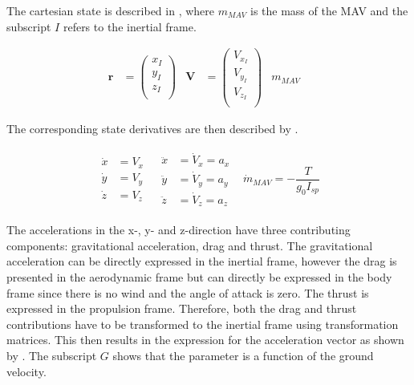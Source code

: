 The cartesian state is described in , where $m_{MAV}$ is the mass of the \ac{MAV} and the subscript $I$ refers to the inertial frame.

\begin{align} \label{eq:state}
\mathbf{r}&=\begin{pmatrix}
x_{I}\\
y_{I}\\
z_{I}\\
\end{pmatrix}
&
\mathbf{V}&=\begin{pmatrix}
V_{x_{I}} \\
V_{y_{I}} \\
V_{z_{I}}\\
\end{pmatrix}
&
m_{MAV}&
\end{align}


\noindent
The corresponding state derivatives are then described by .

\begin{align} \label{eq:state_derivatives}
\begin{split} 
\dot{x}&=V_{x}\\
\dot{y}&=V_{y}\\
\dot{z}&=V_{z}
\end{split} 
&
\begin{split}
\ddot{x}&=\dot{V}_{x}=a_{x}\\
\ddot{y}&=\dot{V}_{y}=a_{y}\\
\ddot{z}&=\dot{V}_{z}=a_{z}
\end{split}
&
\dot{m}_{MAV}=-\dfrac{T}{g_{0}I_{sp}}
\end{align}

\noindent
The accelerations in the x-, y- and z-direction have three contributing components: gravitational acceleration, drag and thrust. The gravitational acceleration can be directly expressed in the inertial frame, however the drag is presented in the aerodynamic frame but can directly be expressed in the body frame since there is no wind and the angle of attack is zero. The thrust is expressed in the propulsion frame. Therefore, both the drag and thrust contributions have to be transformed to the inertial frame using transformation matrices. This then results in the expression for the acceleration vector as shown by . The subscript $G$ shows that the parameter is a function of the ground velocity.

